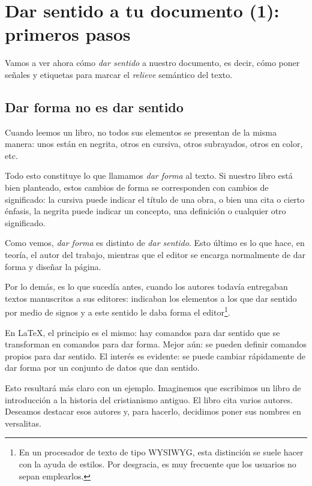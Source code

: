 \chapter{Dar sentido a tu documento (1): primeros pasos}

\begin{intro}
Vamos a ver ahora cómo \emph{dar sentido} a nuestro documento, es decir, cómo poner señales y etiquetas para marcar el \emph{relieve} semántico del texto.
\end{intro}

\section{Dar forma no es dar sentido}\label{sensforme}

Cuando leemos un libro, no todos sus elementos se presentan de la misma manera: unos están en negrita, otros en cursiva, otros subrayados, otros en color, etc.

Todo esto constituye lo que llamamos \emph{dar forma} al texto. Si nuestro libro está bien planteado, estos cambios de forma se corresponden con cambios de significado: la cursiva puede indicar el título de una obra, o bien una cita o cierto énfasis, la negrita puede indicar un concepto, una definición o cualquier otro significado.

Como vemos, \emph{dar forma} es distinto de \emph{dar sentido}. Esto último es lo que hace, en teoría, el autor del trabajo, mientras que el editor se encarga normalmente de dar forma y diseñar la página.

Por lo demás, es lo que sucedía antes, cuando los autores todavía entregaban textos manuscritos a sus editores: indicaban los elementos a los que dar sentido por medio de signos y a este sentido le daba forma el editor\footnote{En un procesador de texto de tipo WYSIWYG, esta distinción se suele hacer con la ayuda de estilos. Por desgracia, es muy frecuente que los usuarios no sepan emplearlos.}.

En \LaTeX, el principio es el mismo: hay comandos para dar sentido que se transforman en comandos para dar forma. Mejor aún: se pueden definir comandos propios para dar sentido. El interés es evidente: se puede cambiar rápidamente de dar forma por un conjunto de datos que dan sentido.

Esto resultará más claro con un ejemplo. Imaginemos que escribimos un libro de introducción a la historia del cristianismo antiguo. El libro cita varios autores. Deseamos destacar esos autores y, para hacerlo, decidimos poner sus nombres en versalitas.

